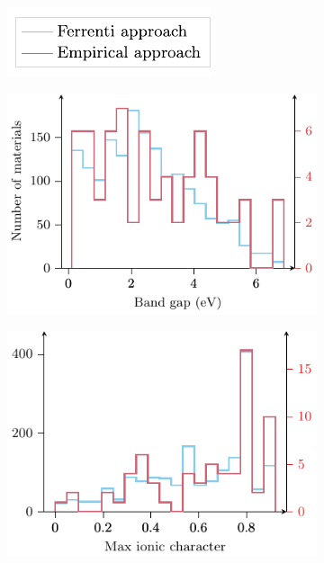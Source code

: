 \documentclass[superscriptaddress,unsortedaddress,
 amsmath,amssymb,
 aps,
]{revtex4-2}
\begin{document}
\begin{figure}[t]
    \begin{subfigure}[b]{1\textwidth}
    \centering
    \includegraphics{figure7-legend.pdf}
  \end{subfigure}
  \par\bigskip
\begin{subfigure}[b]{0.45\textwidth}
    \includegraphics{figure7a.pdf}
    \subcaption{}
\end{subfigure}
\begin{subfigure}[b]{0.45\textwidth}
    \includegraphics{figure7b.pdf}
    \subcaption{}
\end{subfigure}%


\end{figure}
\end{document}
